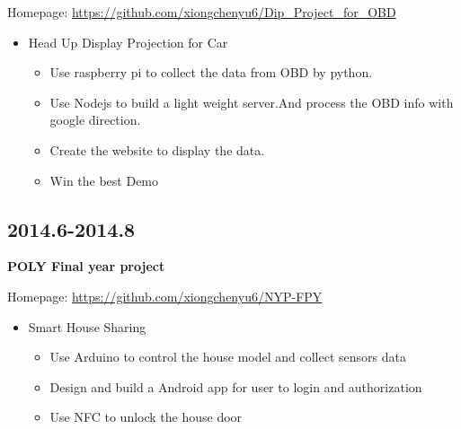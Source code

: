\documentclass[11pt]{article}
\begin{document}
Homepage: \url{https://github.com/xiongchenyu6/Dip\_Project\_for\_OBD}

\begin{itemize}
\item Head Up Display Projection for Car
\begin{itemize}
\item Use raspberry pi to collect the data from OBD by python.
\item Use Nodejs to build a light weight server.And process the OBD info with google direction.
\item Create the website to display the data.
\item Win the best Demo
\end{itemize}
\end{itemize}
\subsection{2014.6-2014.8}
\label{sec:org9c9ee9b}
\textbf{POLY Final year project}

Homepage: \url{https://github.com/xiongchenyu6/NYP-FPY}
\begin{itemize}
\item Smart House Sharing
\begin{itemize}
\item Use Arduino to control the house model and collect sensors data
\item Design and build a Android app for user to login and authorization
\item Use NFC to unlock the house door
\end{itemize}
\end{itemize}
\end{document}
